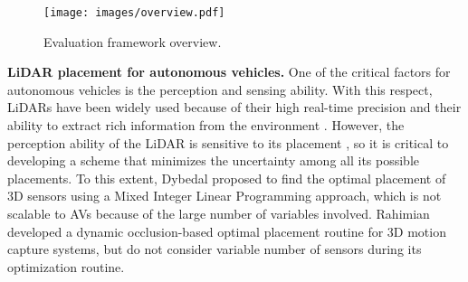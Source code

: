 \documentclass[10pt,twocolumn,letterpaper]{article}
\begin{document}


\begin{figure*}[t!]
\begin{center}
 \texttt{[image: images/overview.pdf]}
\end{center}
\vspace*{-5mm}
  \caption{Evaluation framework overview.}
\label{fig:overview}
\vspace*{-5mm}
\end{figure*}


\textbf{LiDAR placement for autonomous vehicles.}
One of the critical factors for autonomous vehicles is the perception and sensing ability. With this respect, LiDARs have been widely used because of their high real-time precision and their ability to extract rich  information from the environment \cite{maddern2014illumination, geiger2013vision, zhang2014loam}.  However, the perception ability of the LiDAR is sensitive to its placement \cite{zhang1995two, durrant1987consistent}, so it is critical to developing a scheme that minimizes the uncertainty among all its possible placements.
To this extent, Dybedal \etal \cite{dybedal2017optimal} proposed to find the optimal placement of 3D sensors using a Mixed Integer Linear Programming approach, which is not scalable to AVs because of the large number of variables involved. Rahimian \etal  \cite{rahimian2016optimal} developed a dynamic occlusion-based optimal placement routine for 3D motion capture systems, but do not consider variable number of sensors during its optimization routine.
\end{document}
